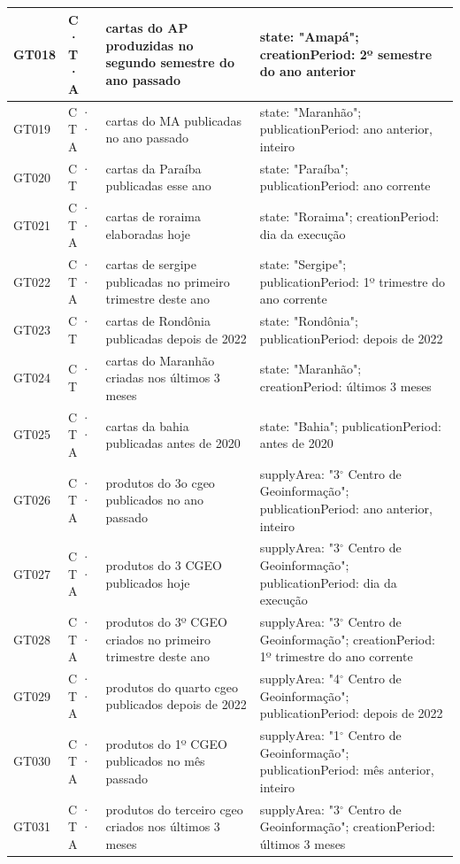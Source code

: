{\begin{longtable}{|p{1.1cm}|p{1.3cm}|p{5.4cm}|p{6.3cm}|}
GT018 & C · T · A & cartas do AP produzidas no segundo semestre do ano passado & state: "Amapá"; creationPeriod: 2º semestre do ano anterior \\ \hline
GT019 & C · T · A & cartas do MA publicadas no ano passado & state: "Maranhão"; publicationPeriod: ano anterior, inteiro \\ \hline
GT020 & C · T & cartas da Paraíba publicadas esse ano & state: "Paraíba"; publicationPeriod: ano corrente \\ \hline
GT021 & C · T · A & cartas de roraima elaboradas hoje & state: "Roraima"; creationPeriod: dia da execução \\ \hline
GT022 & C · T · A & cartas de sergipe publicadas no primeiro trimestre deste ano & state: "Sergipe"; publicationPeriod: 1º trimestre do ano corrente \\ \hline
GT023 & C · T & cartas de Rondônia publicadas depois de 2022 & state: "Rondônia"; publicationPeriod: depois de 2022 \\ \hline
GT024 & C · T & cartas do Maranhão criadas nos últimos 3 meses & state: "Maranhão"; creationPeriod: últimos 3 meses \\ \hline
GT025 & C · T · A & cartas da bahia publicadas antes de 2020 & state: "Bahia"; publicationPeriod: antes de 2020 \\ \hline
GT026 & C · T · A & produtos do 3o cgeo publicados no ano passado & supplyArea: "3$^\circ$ Centro de Geoinformação"; publicationPeriod: ano anterior, inteiro \\ \hline
GT027 & C · T · A & produtos do 3 CGEO publicados hoje & supplyArea: "3$^\circ$ Centro de Geoinformação"; publicationPeriod: dia da execução \\ \hline
GT028 & C · T · A & produtos do 3º CGEO criados no primeiro trimestre deste ano & supplyArea: "3$^\circ$ Centro de Geoinformação"; creationPeriod: 1º trimestre do ano corrente \\ \hline
GT029 & C · T · A & produtos do quarto cgeo publicados depois de 2022 & supplyArea: "4$^\circ$ Centro de Geoinformação"; publicationPeriod: depois de 2022 \\ \hline
GT030 & C · T · A & produtos do 1º CGEO publicados no mês passado & supplyArea: "1$^\circ$ Centro de Geoinformação"; publicationPeriod: mês anterior, inteiro \\ \hline
GT031 & C · T · A & produtos do terceiro cgeo criados nos últimos 3 meses & supplyArea: "3$^\circ$ Centro de Geoinformação"; creationPeriod: últimos 3 meses \\ \hline

\end{longtable}}

